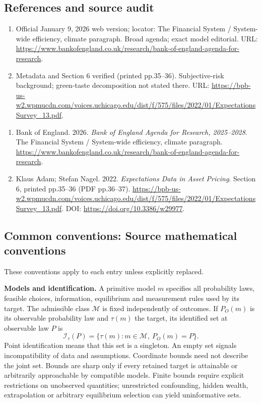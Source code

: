 \documentclass[11pt,a4paper]{article}
\begin{document}
\subsection*{References and source audit}
\begin{enumerate}
\item Official January 9, 2026 web version; locator: The Financial System / System-wide efficiency, climate paragraph. Broad agenda; exact model editorial. URL: \url{https://www.bankofengland.co.uk/research/bank-of-england-agenda-for-research}.
\item Metadata and Section 6 verified (printed pp.35--36). Subjective-risk background; green-taste decomposition not stated there. URL: \url{https://bpb-us-w2.wpmucdn.com/voices.uchicago.edu/dist/f/575/files/2022/01/ExpectationsSurvey_13.pdf}.
\end{enumerate}
\begin{enumerate}\raggedright
\item\hypertarget{definitions:source:30007600:1}{} Bank of England. 2026. \emph{Bank of England Agenda for Research, 2025–2028}. The Financial System / System-wide efficiency, climate paragraph.
\url{https://www.bankofengland.co.uk/research/bank-of-england-agenda-for-research}.
\item\hypertarget{definitions:source:30007600:2}{} Klaus Adam; Stefan Nagel. 2022. \emph{Expectations Data in Asset Pricing}. Section 6, printed pp.35--36 (PDF pp.36--37).
\url{https://bpb-us-w2.wpmucdn.com/voices.uchicago.edu/dist/f/575/files/2022/01/ExpectationsSurvey_13.pdf}.
DOI: \url{https://doi.org/10.3386/w29977}.
\end{enumerate}

\subsection*{Common conventions: Source mathematical conventions}

These conventions apply to each entry unless explicitly replaced.

\textbf{Models and identification.} A primitive model \(m\) specifies all probability laws, feasible choices, information, equilibrium and measurement rules used by its target. The admissible class \(\mathcal M\) is fixed independently of outcomes. If \(P_O(m)\) is its observable probability law and \(\tau(m)\) the target, its identified set at observable law \(P\) is
\[
 \mathcal I_\tau(P)=\{\tau(m):m\in\mathcal M,\ P_O(m)=P\}.
\]
Point identification means that this set is a singleton. An empty set signals incompatibility of data and assumptions. Coordinate bounds need not describe the joint set. Bounds are sharp only if every retained target is attainable or arbitrarily approachable by compatible models. Finite bounds require explicit restrictions on unobserved quantities; unrestricted confounding, hidden wealth, extrapolation or arbitrary equilibrium selection can yield uninformative sets.
\end{document}
